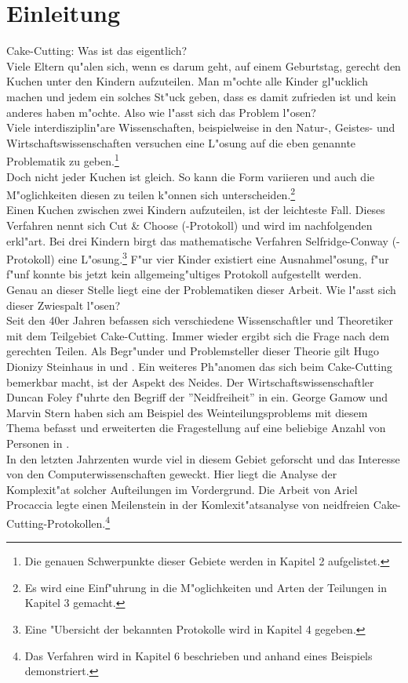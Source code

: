 \documentclass[11pt, a4paper, twoside]{article}
\numberwithin{equation}{section}
\begin{document}
\section{Einleitung}
Cake-Cutting: Was ist das eigentlich?\\
Viele Eltern qu"alen sich, wenn es darum geht, auf einem Geburtstag, gerecht den Kuchen unter den Kindern aufzuteilen. Man m"ochte alle Kinder gl"ucklich machen und jedem ein solches St"uck geben, dass es damit zufrieden ist und kein anderes haben m"ochte. Also wie l"asst sich das Problem l"osen?\\
Viele interdisziplin"are Wissenschaften, beispielweise in den Natur-, Geistes- und Wirtschaftswissenschaften versuchen eine L"osung auf die eben genannte Problematik zu geben.\footnote{Die genauen Schwerpunkte dieser Gebiete werden in Kapitel 2 aufgelistet.}\\
Doch nicht jeder Kuchen ist gleich. So kann die Form variieren und auch die M"oglichkeiten diesen zu teilen k"onnen sich unterscheiden.\footnote{Es wird eine Einf"uhrung in die M"oglichkeiten und Arten der Teilungen in Kapitel 3 gemacht.}\\
Einen Kuchen zwischen zwei Kindern aufzuteilen, ist der leichteste Fall. Dieses Verfahren nennt sich Cut \& Choose (-Protokoll) und wird im nachfolgenden erkl"art. Bei drei Kindern birgt das mathematische Verfahren Selfridge-Conway (-Protokoll) eine L"osung.\footnote{Eine "Ubersicht der bekannten Protokolle wird in Kapitel 4 gegeben.} F"ur vier Kinder existiert eine Ausnahmel"osung, f"ur f"unf konnte bis jetzt kein allgemeing"ultiges Protokoll aufgestellt werden.\\
Genau an dieser Stelle liegt eine der Problematiken dieser Arbeit. Wie l"asst sich dieser Zwiespalt l"osen?\\
Seit den 40er Jahren befassen sich verschiedene Wissenschaftler und Theoretiker mit dem Teilgebiet Cake-Cutting. Immer wieder ergibt sich die Frage nach dem gerechten Teilen. Als Begr"under und Problemsteller dieser Theorie gilt Hugo Dionizy Steinhaus in \cite{7} und \cite{17}. Ein weiteres Ph"anomen das sich beim Cake-Cutting bemerkbar macht, ist der Aspekt des Neides. Der Wirtschaftswissenschaftler Duncan Foley f"uhrte den Begriff der ''Neidfreiheit'' in \cite{8} ein. George Gamow und Marvin Stern haben sich am Beispiel des Weinteilungsproblems mit diesem Thema befasst und erweiterten die Fragestellung auf eine beliebige Anzahl von Personen in \cite{18}.\\
In den letzten Jahrzenten wurde viel in diesem Gebiet geforscht und das Interesse von den Computerwissenschaften geweckt. Hier liegt die Analyse der Komplexit"at solcher Aufteilungen im Vordergrund. Die Arbeit von Ariel Procaccia \cite{9} legte einen Meilenstein in der Komlexit"atsanalyse von neidfreien Cake-Cutting-Protokollen.\footnote{Das Verfahren wird in Kapitel 6 beschrieben und anhand eines Beispiels demonstriert.}\\
\end{document}
